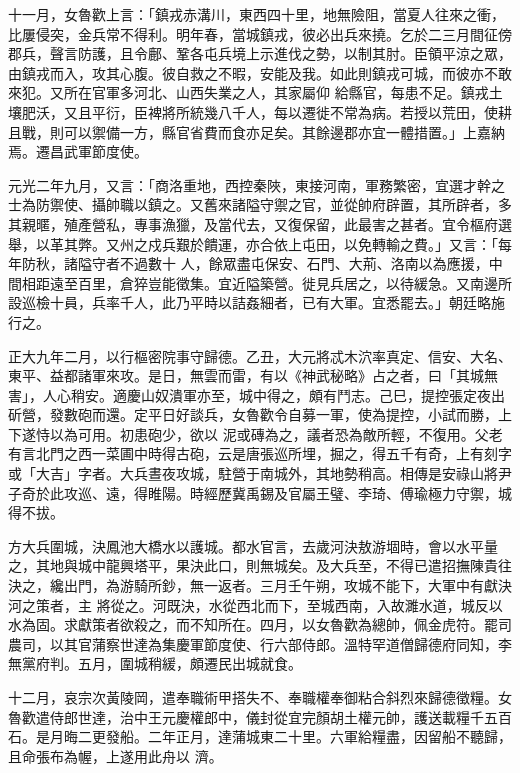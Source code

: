 \begin{pinyinscope}
 十一月，女魯歡上言：「鎮戎赤溝川，東西四十里，地無險阻，當夏人往來之衝，比屢侵突，金兵常不得利。明年春，當城鎮戎，彼必出兵來撓。乞於二三月間征傍郡兵，聲言防護，且令鄜、鞏各屯兵境上示進伐之勢，以制其肘。臣領平涼之眾，由鎮戎而入，攻其心腹。彼自救之不暇，安能及我。如此則鎮戎可城，而彼亦不敢來犯。又所在官軍多河北、山西失業之人，其家屬仰
 給縣官，每患不足。鎮戎土壤肥沃，又且平衍，臣裨將所統幾八千人，每以遷徙不常為病。若授以荒田，使耕且戰，則可以禦備一方，縣官省費而食亦足矣。其餘邊郡亦宜一體措置。」上嘉納焉。遷昌武軍節度使。



 元光二年九月，又言：「商洛重地，西控秦陜，東接河南，軍務繁密，宜選才幹之士為防禦使、攝帥職以鎮之。又舊來諸隘守禦之官，並從帥府辟置，其所辟者，多其親暱，殖產營私，專事漁獵，及當代去，又復保留，此最害之甚者。宜令樞府選舉，以革其弊。又州之戍兵艱於饋運，亦合依上屯田，以免轉輸之費。」又言：「每年防秋，諸隘守者不過數十
 人，餘眾盡屯保安、石門、大荊、洛南以為應援，中間相距遠至百里，倉猝豈能徵集。宜近隘築營。徙見兵居之，以待緩急。又南邊所設巡檢十員，兵率千人，此乃平時以詰姦細者，已有大軍。宜悉罷去。」朝廷略施行之。



 正大九年二月，以行樞密院事守歸德。乙丑，大元將忒木泬率真定、信安、大名、東平、益都諸軍來攻。是日，無雲而雷，有以《神武秘略》占之者，曰「其城無害」，人心稍安。適慶山奴潰軍亦至，城中得之，頗有鬥志。己巳，提控張定夜出斫營，發數砲而還。定平日好談兵，女魯歡令自募一軍，使為提控，小試而勝，上下遂恃以為可用。初患砲少，欲以
 泥或磚為之，議者恐為敵所輕，不復用。父老有言北門之西一菜圃中時得古砲，云是唐張巡所埋，掘之，得五千有奇，上有刻字或「大吉」字者。大兵晝夜攻城，駐營于南城外，其地勢稍高。相傳是安祿山將尹子奇於此攻巡、遠，得睢陽。時經歷冀禹錫及官屬王璧、李琦、傅瑜極力守禦，城得不拔。



 方大兵圍城，決鳳池大橋水以護城。都水官言，去歲河決敖游堌時，會以水平量之，其地與城中龍興塔平，果決此口，則無城矣。及大兵至，不得已遣招撫陳貴往決之，纔出門，為游騎所鈔，無一返者。三月壬午朔，攻城不能下，大軍中有獻決河之策者，主
 將從之。河既決，水從西北而下，至城西南，入故濉水道，城反以水為固。求獻策者欲殺之，而不知所在。四月，以女魯歡為總帥，佩金虎符。罷司農司，以其官蒲察世達為集慶軍節度使、行六部侍郎。溫特罕道僧歸德府同知，李無黨府判。五月，圍城稍緩，頗遷民出城就食。



 十二月，哀宗次黃陵岡，遣奉職術甲搭失不、奉職權奉御粘合斜烈來歸德徵糧。女魯歡遣侍郎世達，治中王元慶權郎中，儀封從宜完顏胡土權元帥，護送載糧千五百石。是月晦二更發船。二年正月，達蒲城東二十里。六軍給糧盡，因留船不聽歸，且命張布為幄，上遂用此舟以
 濟。




\end{pinyinscope}
